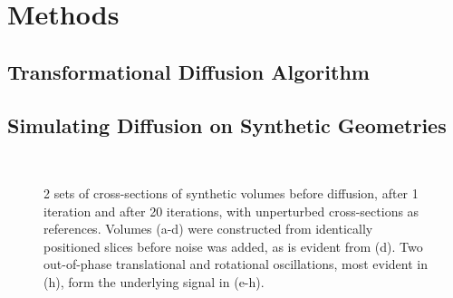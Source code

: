 \section{Methods} %
\label{sec:methods}
  \subsection{Transformational Diffusion Algorithm} %
  \label{sub:transformational_diffusion_algorithm}
    
    
  \subsection{Simulating Diffusion on Synthetic Geometries} %
  \label{sub:simulating_diffusion_on_synthetic_geometries}
    
    \begin{figure}[!t]
      \centering
      \\
      \caption{2 sets of cross-sections of synthetic volumes before diffusion, after 1 iteration and after 20 iterations, with unperturbed cross-sections as references. Volumes (a-d) were constructed from identically positioned slices before noise was added, as is evident from (d). Two out-of-phase translational and rotational oscillations, most evident in (h), form the underlying signal in (e-h).}
      \label{fig:synthetic_cross_sections}
    \end{figure}
    
